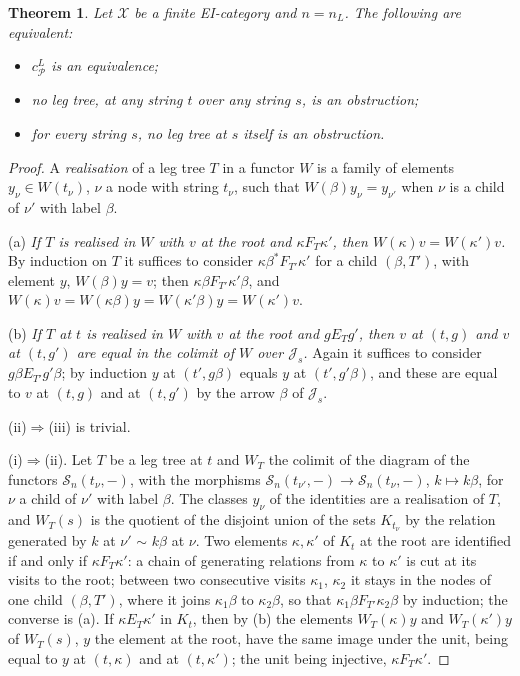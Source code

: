 \documentclass[11pt]{amsart}
\newtheorem{thm}{Theorem}[section]
\theoremstyle{definition}
\newcommand{\cX}{\mathcal X}
\newcommand{\cP}{\mathcal P}
\newcommand{\cS}{\mathcal S}
\newcommand{\cJ}{\mathcal J}
\begin{document}
\begin{thm}\label{thm:tree}
Let $\cX$ be a finite EI-category and $n=n_L$. The following are
equivalent:
\begin{itemize}
\item[(i)] $c^L_\cP$ is an equivalence;
\item[(ii)] no leg tree, at any string $t$ over any string $s$, is an
obstruction;
\item[(iii)] for every string $s$, no leg tree at $s$ itself is an
obstruction.
\end{itemize}
\end{thm}
\begin{proof}
A \emph{realisation} of a leg tree $T$ in a functor $W$ is a family of
elements $y_\nu\in W(t_\nu)$, $\nu$ a node with string $t_\nu$, such
that $W(\beta)y_\nu=y_{\nu'}$ when $\nu$ is a child of $\nu'$ with
label $\beta$.

(a) \emph{If $T$ is realised in $W$ with $v$ at the root and $\kappa
\mathrel{F_T}\kappa'$, then $W(\kappa)v=W(\kappa')v$.} By induction on
$T$ it suffices to consider $\kappa\mathrel{\beta^*F_{T'}}\kappa'$ for
a child $(\beta,T')$, with element $y$, $W(\beta)y=v$; then
$\kappa\beta\mathrel{F_{T'}}\kappa'\beta$, and $W(\kappa)v=W(\kappa
\beta)y=W(\kappa'\beta)y=W(\kappa')v$.

(b) \emph{If $T$ at $t$ is realised in $W$ with $v$ at the root and
$g\mathrel{E_T}g'$, then $v$ at $(t,g)$ and $v$ at $(t,g')$ are equal
in the colimit of $W$ over $\cJ_s$.} Again it suffices to consider
$g\beta\mathrel{E_{T'}}g'\beta$; by induction $y$ at $(t',g\beta)$
equals $y$ at $(t',g'\beta)$, and these are equal to $v$ at $(t,g)$
and at $(t,g')$ by the arrow $\beta$ of $\cJ_s$.

(ii)$\Rightarrow$(iii) is trivial.

(i)$\Rightarrow$(ii). Let $T$ be a leg tree at $t$ and $W_T$ the
colimit of the diagram of the functors $\cS_n(t_\nu,-)$, with the
morphisms $\cS_n(t_{\nu'},-)\to\cS_n(t_\nu,-)$, $k\mapsto k\beta$, for
$\nu$ a child of $\nu'$ with label $\beta$. The classes $y_\nu$ of
the identities are a realisation of $T$, and $W_T(s)$ is the quotient
of the disjoint union of the sets $K_{t_\nu}$ by the relation
generated by $k$ at $\nu'$ $\sim$ $k\beta$ at $\nu$. Two elements
$\kappa,\kappa'$ of $K_t$ at the root are identified if and only if
$\kappa\mathrel{F_T}\kappa'$: a chain of generating relations from
$\kappa$ to $\kappa'$ is cut at its visits to the root; between two
consecutive visits $\kappa_1$, $\kappa_2$ it stays in the nodes of
one child $(\beta,T')$, where it joins $\kappa_1\beta$ to
$\kappa_2\beta$, so that $\kappa_1\beta\mathrel{F_{T'}}\kappa_2\beta$
by induction; the converse is (a). If $\kappa\mathrel{E_T}\kappa'$ in
$K_t$, then by (b) the elements $W_T(\kappa)y$ and $W_T(\kappa')y$ of
$W_T(s)$, $y$ the element at the root, have the same image under the
unit, being equal to $y$ at $(t,\kappa)$ and at $(t,\kappa')$; the
unit being injective, $\kappa\mathrel{F_T}\kappa'$.


\end{proof}
\end{document}
